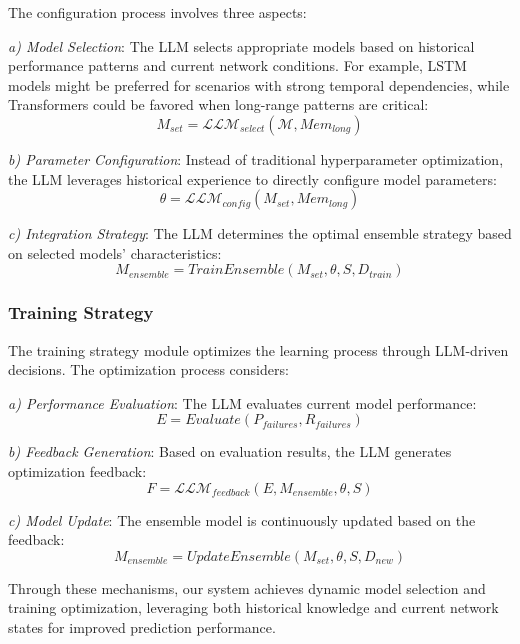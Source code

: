 \documentclass[conference]{IEEEtran}
\begin{document}
The configuration process involves three aspects:

\textit{a) Model Selection}: The LLM selects appropriate models based on historical performance patterns and current network conditions. For example, LSTM models might be preferred for scenarios with strong temporal dependencies, while Transformers could be favored when long-range patterns are critical:
\begin{equation}
    M_{set} = \mathcal{LLM}_{select}(\mathcal{M}, Mem_{long})
\end{equation}

\textit{b) Parameter Configuration}: Instead of traditional hyperparameter optimization, the LLM leverages historical experience to directly configure model parameters:
\begin{equation}
    \theta = \mathcal{LLM}_{config}(M_{set}, Mem_{long})
\end{equation}

\textit{c) Integration Strategy}: The LLM determines the optimal ensemble strategy based on selected models' characteristics:
\begin{equation}
    M_{ensemble} = TrainEnsemble(M_{set}, \theta, S, D_{train})
\end{equation}

\subsubsection{Training Strategy}
The training strategy module optimizes the learning process through LLM-driven decisions. The optimization process considers:

\textit{a) Performance Evaluation}: The LLM evaluates current model performance:
\begin{equation}
    E = Evaluate(P_{failures}, R_{failures})
\end{equation}

\textit{b) Feedback Generation}: Based on evaluation results, the LLM generates optimization feedback:
\begin{equation}
    F = \mathcal{LLM}_{feedback}(E, M_{ensemble}, \theta, S)
\end{equation}

\textit{c) Model Update}: The ensemble model is continuously updated based on the feedback:
\begin{equation}
    M_{ensemble} = UpdateEnsemble(M_{set}, \theta, S, D_{new})
\end{equation}

Through these mechanisms, our system achieves dynamic model selection and training optimization, leveraging both historical knowledge and current network states for improved prediction performance.
\end{document}
